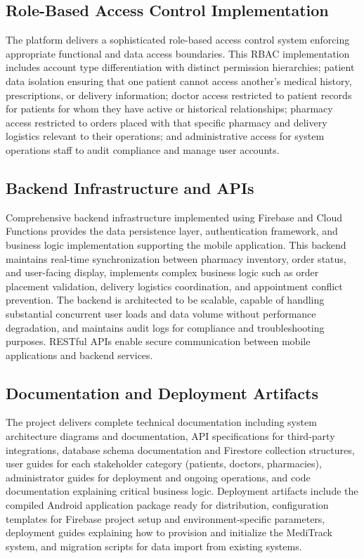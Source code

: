 \documentclass[12pt,a4paper]{report}
\begin{document}
\subsection{Role-Based Access Control Implementation}

The platform delivers a sophisticated role-based access control system enforcing appropriate functional and data access boundaries. This RBAC implementation includes account type differentiation with distinct permission hierarchies; patient data isolation ensuring that one patient cannot access another's medical history, prescriptions, or delivery information; doctor access restricted to patient records for patients for whom they have active or historical relationships; pharmacy access restricted to orders placed with that specific pharmacy and delivery logistics relevant to their operations; and administrative access for system operations staff to audit compliance and manage user accounts.

\subsection{Backend Infrastructure and APIs}

Comprehensive backend infrastructure implemented using Firebase and Cloud Functions provides the data persistence layer, authentication framework, and business logic implementation supporting the mobile application. This backend maintains real-time synchronization between pharmacy inventory, order status, and user-facing display, implements complex business logic such as order placement validation, delivery logistics coordination, and appointment conflict prevention. The backend is architected to be scalable, capable of handling substantial concurrent user loads and data volume without performance degradation, and maintains audit logs for compliance and troubleshooting purposes. RESTful APIs enable secure communication between mobile applications and backend services.

\subsection{Documentation and Deployment Artifacts}

The project delivers complete technical documentation including system architecture diagrams and documentation, API specifications for third-party integrations, database schema documentation and Firestore collection structures, user guides for each stakeholder category (patients, doctors, pharmacies), administrator guides for deployment and ongoing operations, and code documentation explaining critical business logic. Deployment artifacts include the compiled Android application package ready for distribution, configuration templates for Firebase project setup and environment-specific parameters, deployment guides explaining how to provision and initialize the MediTrack system, and migration scripts for data import from existing systems.
\end{document}
